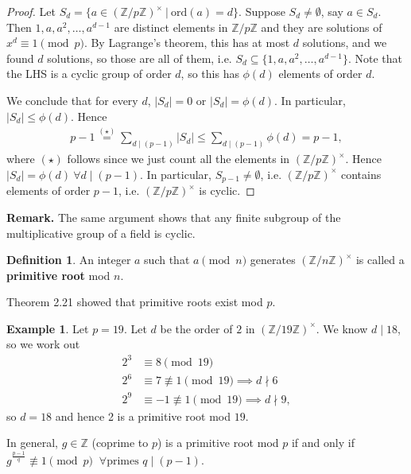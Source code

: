 \documentclass{article}
\theoremstyle{definition}
\newtheorem{example}{Example}[section]
\newtheorem{defn}{Definition}[section]
\begin{document}
\begin{proof}
    Let $S_d = \{a \in (\mathbb{Z}/p\mathbb{Z})^{\times} ~|~ \text{ord}(a) = d\}$. Suppose $S_d \neq \emptyset$, say $a \in S_d$. Then $1,a,a^2,\ldots,a^{d-1}$ are distinct elements in $\mathbb{Z}/p\mathbb{Z}$ and they are solutions of $x^d \equiv 1 \pmod{p}$. By Lagrange's theorem, this has at most $d$ solutions, and we found $d$ solutions, so those are all of them, i.e. $S_d \subseteq \{1,a,a^2,\ldots,a^{d-1}\}$. Note that the LHS is a cyclic group of order $d$, so this has $\phi(d)$ elements of order $d$.
    \vspace{1mm}
    
    We conclude that for every $d$, $|S_d| = 0$ or $|S_d| = \phi(d)$. In particular, ${|S_d| \le \phi(d)}$. Hence
    \begin{align*}
       p-1 \stackrel{(\star)}{=} \sum_{d \mid (p-1)}^{} |S_d| \le  \sum_{d \mid (p-1)}^{} \phi(d) = p-1,
    \end{align*}
    where $(\star)$ follows since we just count all the elements in $(\mathbb{Z}/p\mathbb{Z})^{\times}$. Hence ${|S_d| = \phi(d) ~\forall  d \mid (p-1)}$. In particular, $S_{p-1} \neq \emptyset$, i.e. $(\mathbb{Z}/p\mathbb{Z})^{\times}$ contains elements of order $p-1$, i.e. $(\mathbb{Z}/p\mathbb{Z})^{\times}$ is cyclic. 
\end{proof}
\textbf{Remark.} The same argument shows that any finite subgroup of the multiplicative group of a field is cyclic.
\begin{defn}
    An integer $a$ such that $a \pmod{n}$ generates $(\mathbb{Z}/n\mathbb{Z})^{\times}$ is called a \textbf{primitive root} mod $n$. 
\end{defn}
Theorem 2.21 showed that primitive roots exist mod $p$.
\begin{example}
    Let $p = 19$. Let $d$ be the order of $2$ in $(\mathbb{Z}/19\mathbb{Z})^{\times}$. We know $d \mid 18$, so we work out 
    \begin{align*}
        2^3 &\equiv 8 \pmod{19}\\
        2^6 &\equiv 7 \not\equiv 1 \pmod{19} \implies d \nmid 6\\
        2^9 &\equiv -1 \not\equiv 1 \pmod{19} \implies d \nmid 9,
    \end{align*}
    so $d=18$ and hence 2 is a primitive root mod $19$.
\end{example}
In general, $g \in \mathbb{Z}$ (coprime to $p$) is a primitive root mod $p$ if and only if $g^{\frac{p-1}{q}} \not\equiv 1 \pmod{p}$ $~\forall \text{primes }q \mid (p-1)$.
\end{document}
